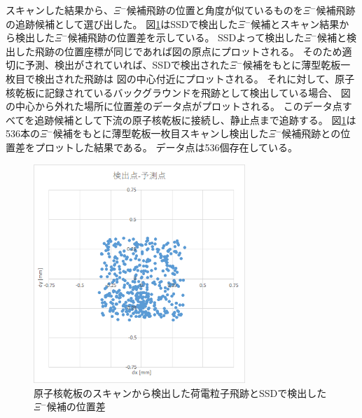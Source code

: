\documentclass[12pt,a4paper]{jarticle}
\begin{document}
スキャンした結果から、$\Xi$$^-$候補飛跡の位置と角度が似ているものを$\Xi$$^-$候補飛跡の追跡候補として選び出した。
図\ref{fig:ssd_pl01}はSSDで検出した$\Xi$$^-$候補とスキャン結果から検出した$\Xi$$^-$候補飛跡の位置差を示している。
SSDよって検出した$\Xi$$^-$候補と検出した飛跡の位置座標が同じであれば図の原点にプロットされる。
そのため適切に予測、検出がされていれば、SSDで検出された$\Xi$$^-$候補をもとに薄型乾板一枚目で検出された飛跡は
図の中心付近にプロットされる。
それに対して、原子核乾板に記録されているバックグラウンドを飛跡として検出している場合、
図の中心から外れた場所に位置差のデータ点がプロットされる。
このデータ点すべてを追跡候補として下流の原子核乾板に接続し、静止点まで追跡する。
図\ref{fig:ssd_pl01}は536本の$\Xi$$^-$候補をもとに薄型乾板一枚目スキャンし検出した$\Xi$$^-$候補飛跡との位置差をプロットした結果である。
データ点は536個存在している。
\begin{figure}[htbp]
  \centering
     \includegraphics[width=80mm]{dx_dy.png}
  \caption{原子核乾板のスキャンから検出した荷電粒子飛跡とSSDで検出した$\Xi$$^-$候補の位置差\label{fig:ssd_pl01}}
\end{figure}
\end{document}
